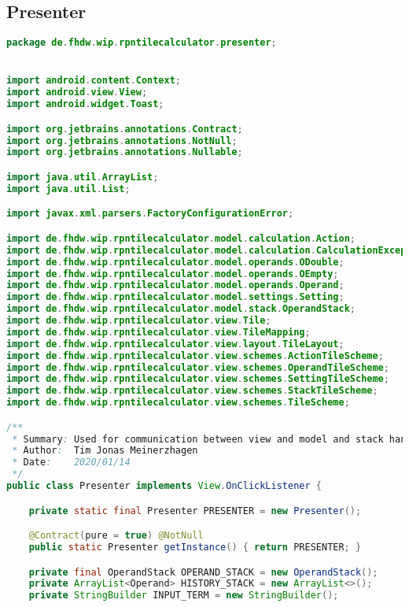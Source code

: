 \subsection{Presenter}

\begin{lstlisting}[caption=Presenter,label=list:Presenter,language=Java]
package de.fhdw.wip.rpntilecalculator.presenter;


import android.content.Context;
import android.view.View;
import android.widget.Toast;

import org.jetbrains.annotations.Contract;
import org.jetbrains.annotations.NotNull;
import org.jetbrains.annotations.Nullable;

import java.util.ArrayList;
import java.util.List;

import javax.xml.parsers.FactoryConfigurationError;

import de.fhdw.wip.rpntilecalculator.model.calculation.Action;
import de.fhdw.wip.rpntilecalculator.model.calculation.CalculationException;
import de.fhdw.wip.rpntilecalculator.model.operands.ODouble;
import de.fhdw.wip.rpntilecalculator.model.operands.OEmpty;
import de.fhdw.wip.rpntilecalculator.model.operands.Operand;
import de.fhdw.wip.rpntilecalculator.model.settings.Setting;
import de.fhdw.wip.rpntilecalculator.model.stack.OperandStack;
import de.fhdw.wip.rpntilecalculator.view.Tile;
import de.fhdw.wip.rpntilecalculator.view.TileMapping;
import de.fhdw.wip.rpntilecalculator.view.layout.TileLayout;
import de.fhdw.wip.rpntilecalculator.view.schemes.ActionTileScheme;
import de.fhdw.wip.rpntilecalculator.view.schemes.OperandTileScheme;
import de.fhdw.wip.rpntilecalculator.view.schemes.SettingTileScheme;
import de.fhdw.wip.rpntilecalculator.view.schemes.StackTileScheme;
import de.fhdw.wip.rpntilecalculator.view.schemes.TileScheme;

/**
 * Summary: Used for communication between view and model and stack handling
 * Author:  Tim Jonas Meinerzhagen
 * Date:    2020/01/14
 */
public class Presenter implements View.OnClickListener {

    private static final Presenter PRESENTER = new Presenter();

    @Contract(pure = true) @NotNull
    public static Presenter getInstance() { return PRESENTER; }

    private final OperandStack OPERAND_STACK = new OperandStack();
    private ArrayList<Operand> HISTORY_STACK = new ArrayList<>();
    private StringBuilder INPUT_TERM = new StringBuilder();


\end{lstlisting}
